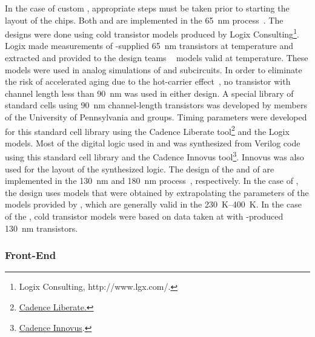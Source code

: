 In the case of custom , appropriate steps must be taken prior 
to starting the layout of the chips. Both  and 
 are implemented in the  \SI{65}{nm}  
process~\cite{TSMC65}. The designs were done using cold transistor models 
produced by Logix Consulting\footnote{Logix\texttrademark{} Consulting, http://www.lgx.com/.}.  Logix made measurements of 
-supplied  \SI{65}{nm} transistors at \lntwo 
temperature and extracted and provided to the design teams ~\cite{spice}
models valid at \lntwo temperature.  These models were used in 
analog simulations of  and  subcircuits.  
In order to eliminate the risk of accelerated aging due to the hot-carrier
effect~\cite{Hot-electron}, no transistor with channel length
less than \SI{90}{nm} was used in either  design.
A special library of standard cells using \SI{90}{nm} channel-length 
transistors was developed by members of the University
of Pennsylvania and  groups. Timing parameters were
developed for this standard cell library using the Cadence Liberate
tool\footnote{
\href{https://www.cadence.com/content/cadence-www/global/en_US/home/tools/custom-ic-analog-rf-design/library-characterization/liberate-characterization.html}{Cadence Liberate\texttrademark{}.}
} 
and the Logix  models. Most of the digital logic
used in  and  was synthesized 
from Verilog code using this standard cell library and the Cadence Innovus tool\footnote{
\href{https://www.cadence.com/content/cadence-www/global/en_US/home/tools/digital-design-and-signoff/hierarchical-design-and-floorplanning/innovus-implementation-system.html}{Cadence Innovus\texttrademark{}}.}.
Innovus was also used for the layout of the synthesized logic.
The design of the   and of 
are implemented in the  \SI{130}{nm} and \SI{180}{nm} 
 process~\cite{TSMC130,TSMC180}, respectively. 
In the case of , 
the design uses models that were obtained by extrapolating the
parameters of the models provided by , which are 
generally valid in the \SIrange{230}{400}{K}. In the case of the 
, cold transistor models were based on data taken at  with
-produced \SI{130}{nm} transistors.

\subsubsection{Front-End }
\label{sec:fdsp-tpcelec-design-femb-fe}

